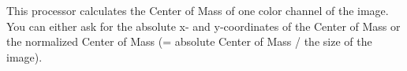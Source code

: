 This processor calculates the Center of Mass of one color channel of the image. You can either ask for the absolute x- and y-coordinates of the Center of Mass or the normalized Center of Mass (= absolute Center of Mass / the size of the image).